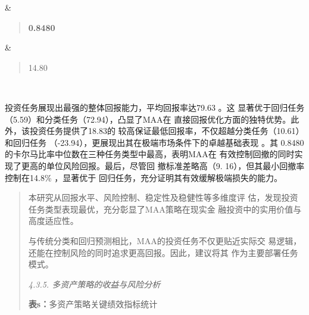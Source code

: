 \documentclass[UTF8]{ctexart}
\begin{document}
{\begin{longtable}[]
\begin{minipage}[t]{\linewidth}
\end{minipage} & \begin{minipage}[t]{\linewidth}\raggedright
\begin{quote}
\textbf{0.8480}
\end{quote}
\end{minipage} & \begin{minipage}[t]{\linewidth}\raggedright
\begin{quote}
14.80
\end{quote}
\end{minipage} \\
\end{longtable}
}

投资任务展现出最强的整体回报能力，平均回报率达79.63 。这
显著优于回归任务（5.59）和分类任务（72.94），凸显了MAA在
直接回报优化方面的独特优势。此外，该投资任务提供了18.83的
较高保证最低回报率，不仅超越分类任务（10.61）和回归任务
（-23.94），更展现出其在极端市场条件下的卓越基础表现 。其
0.8480的卡尔马比率中位数在三种任务类型中最高，表明MAA在
有效控制回撤的同时实现了更高的单位风险回报。最后，尽管回
撤标准差略高（9. 16），但其最小回撤率控制在14.8\% ，显著优于
回归任务，充分证明其有效缓解极端损失的能力。

\begin{quote}
本研究从回报水平、风险控制、稳定性及稳健性等多维度评
估，发现投资任务类型表现最优，充分彰显了MAA策略在现实金
融投资中的实用价值与高度适应性。

与传统分类和回归预测相比，MAA的投资任务不仅更贴近实际交
易逻辑，还能在控制风险的同时追求更高回报。因此，建议将其
作为主要部署任务模式。

\protect{}\label{bookmark50}{}\emph{4.3.5.
多资产策略的收益与风险分析}

\textbf{表s：}多资产策略关键绩效指标统计
\end{quote}
\end{document}
